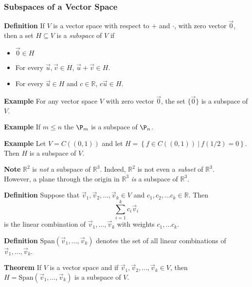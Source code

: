  \begin{frame}[fragile]\frametitle{Subspaces of a Vector Space}
\textbf{Definition}
If $V$ is a vector space with respect to $+$ and $\cdot$,  with zero vector $\vec{0}$,
then a set $H \subseteq V$ is a {\em subspace} of $V$ if 
\begin{itemize}
\item $\vec{0} \in H$
\item For every $\vec{u}, \vec{v} \in H$, $\vec{u} + \vec{v} \in H$.
\item For every $\vec{u} \in H$ and $c \in \mathbb R$, $c\vec{u} \in H$.
\end{itemize}



\textbf{Example}
For any vector space $V$ with zero vector $\vec{0}$, the set
$\{ \vec{0} \}$ is a subspace of $V$.

\end{frame}






 \begin{frame}[fragile]

\textbf{Example}
 If $m \le n$ the $\P_m $ is a subspace of $\P_n$.



\textbf{Example}
Let $V= C( (0,1) )$ and let $H=  \left\{ f \in C( (0,1) ) \ |\ f(1/2)=0\right\}$.  Then $H$ is a subspace of $V$.



\textbf{Note}
 $\mathbb R^2$ is {\em not} a subspace of $\mathbb R^3$.  Indeed, $\mathbb R^2$ is not even a 
{\em subset} of $\mathbb R^3$.  \\   
However, a plane through the origin in $\mathbb R^3$ {\em is} a subspace
of $\mathbb R^3$.

\end{frame}






 \begin{frame}[fragile]
\textbf{Definition}
Suppose that 
$\vec{v}_1, \vec{v}_2, \dots, \vec{v}_k \in V$ and
$c_1, c_2, \dots c_k\in \mathbb R$.  Then
\[
\sum_{i=1}^k c_i\vec{v}_i
\]
is the linear combination of $\vec{v}_1, \dots , \vec{v}_k$ with weights
$c_1, \dots c_k$.



\textbf{Definition}
$\mbox{Span$(\vec{v}_1, \dots, \vec{v}_k)$}$ denotes the set of all linear combinations 
of $\vec{v}_1, \dots , \vec{v}_k$.



\textbf{Theorem}
If $V$ is a vector space and if 
$\vec{v}_1, \vec{v}_2, \dots , \vec{v}_k \in V$, then 
$H=\mbox{Span$(\vec{v}_1, \dots, \vec{v}_k)$}$ is a subspace of $V$.

\end{frame}





